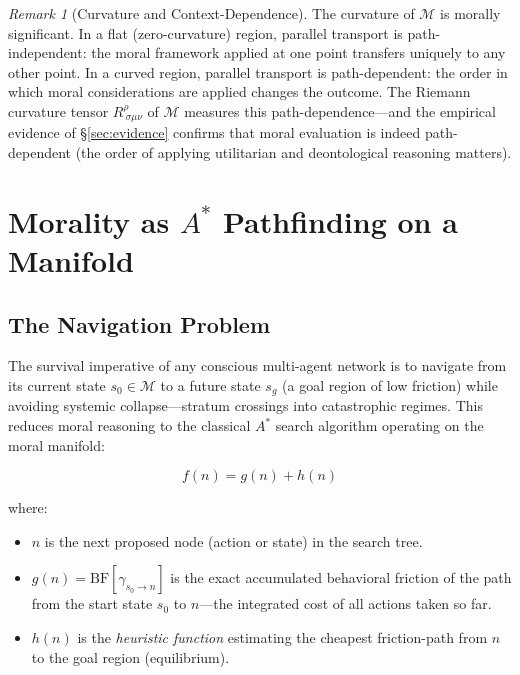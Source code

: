 \documentclass[12pt,letterpaper]{article}
\theoremstyle{definition}
\theoremstyle{remark}
\newtheorem{remark}[theorem]{Remark}
\newcommand{\M}{\mathcal{M}}
\newcommand{\BF}{\mathrm{BF}}
\begin{document}
\begin{remark}[Curvature and Context-Dependence]
The curvature of $\M$ is morally significant. In a flat (zero-curvature) region, parallel transport is path-independent: the moral framework applied at one point transfers uniquely to any other point. In a curved region, parallel transport is path-dependent: the order in which moral considerations are applied changes the outcome. The Riemann curvature tensor $R^\rho_{\ \sigma\mu\nu}$ of $\M$ measures this path-dependence---and the empirical evidence of \S\ref{sec:evidence} confirms that moral evaluation is indeed path-dependent (the order of applying utilitarian and deontological reasoning matters).
\end{remark}


\section{Morality as \texorpdfstring{$A^*$}{A*} Pathfinding on a Manifold}
\label{sec:pathfinding}

\subsection{The Navigation Problem}

The survival imperative of any conscious multi-agent network is to navigate from its current state $s_0 \in \M$ to a future state $s_g$ (a goal region of low friction) while avoiding systemic collapse---stratum crossings into catastrophic regimes. This reduces moral reasoning to the classical $A^*$ search algorithm operating on the moral manifold:

\begin{equation}
f(n) = g(n) + h(n)
\label{eq:astar}
\end{equation}

where:
\begin{itemize}
    \item $n$ is the next proposed node (action or state) in the search tree.
    \item $g(n) = \BF[\gamma_{s_0 \to n}]$ is the exact accumulated behavioral friction of the path from the start state $s_0$ to $n$---the integrated cost of all actions taken so far.
    \item $h(n)$ is the \emph{heuristic function} estimating the cheapest friction-path from $n$ to the goal region (equilibrium).
\end{itemize}
\end{document}
